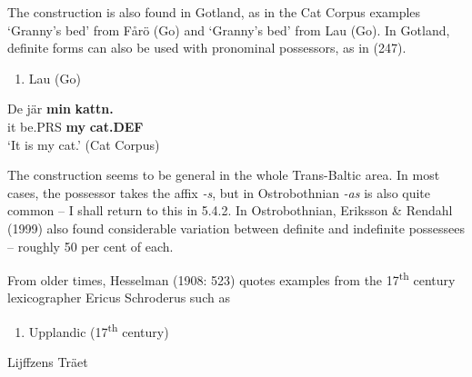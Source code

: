 The construction is also found in Gotland, as in the Cat Corpus examples  ‘Granny’s bed’ from Fårö (Go) and ‘Granny’s bed’ from Lau (Go). In Gotland, definite forms can also be used with pronominal possessors, as in (247).

\begin{enumerate} %
\item 
\label{bkm:Ref155247297}Lau (Go)

\end{enumerate} %
\ea\label{}
\gll De  jär  \textbf{min} \textbf{kattn.}\\


it  be.PRS  \textbf{my} \textbf{cat.DEF}\\ %


 ‘It is my cat.’ (Cat Corpus)
\z

The construction seems to be general in the whole Trans-Baltic area. In most cases, the possessor takes the affix\textit{ {}-s}, but in Ostrobothnian\textit{ {}-as }is also quite common – I shall return to this in 5.4.2. In Ostrobothnian, Eriksson \& Rendahl (1999) also found considerable variation between definite and indefinite possessees – roughly 50 per cent of each. 

From older times, Hesselman (1908: 523) quotes examples from the 17\textsuperscript{th} century lexicographer Ericus Schroderus such as

\begin{enumerate} %
\item 
Upplandic (17\textsuperscript{th} century)
\end{enumerate} %
\ea\label{}
\gll Lijffzens  Träet\\


